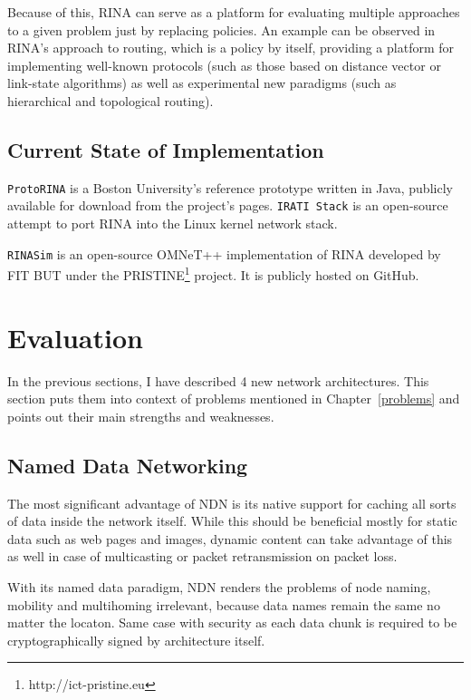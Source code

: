                 Because of this, RINA can serve as a platform for evaluating multiple approaches to a given problem just by replacing policies. An example can be observed in RINA's approach to routing, which is a policy by itself, providing a platform for implementing well-known protocols (such as those based on distance vector or link-state algorithms) as well as experimental new paradigms (such as hierarchical and topological routing).

        \subsection{Current State of Implementation}

            \texttt{ProtoRINA} is a Boston University's reference prototype written in Java, publicly available for download from the project's pages. \texttt{IRATI Stack} is an open-source attempt to port RINA into the Linux kernel network stack.

            \texttt{RINASim} is an open-source OMNeT++ implementation of RINA developed by FIT BUT under the PRISTINE\footnote{http://ict-pristine.eu} project. It is publicly hosted on GitHub.

    \section{Evaluation}

        In the previous sections, I have described 4 new network architectures. This section puts them into context of problems mentioned in Chapter~\ref{problems} and points out their main strengths and weaknesses.

        \subsection{Named Data Networking}

            The most significant advantage of NDN is its native support for caching all sorts of data inside the network itself. While this should be beneficial mostly for static data such as web pages and images, dynamic content can take advantage of this as well in case of multicasting or packet retransmission on packet loss.

            With its named data paradigm, NDN renders the problems of node naming, mobility and multihoming irrelevant, because data names remain the same no matter the locaton. Same case with security as each data chunk is required to be cryptographically signed by architecture itself.

